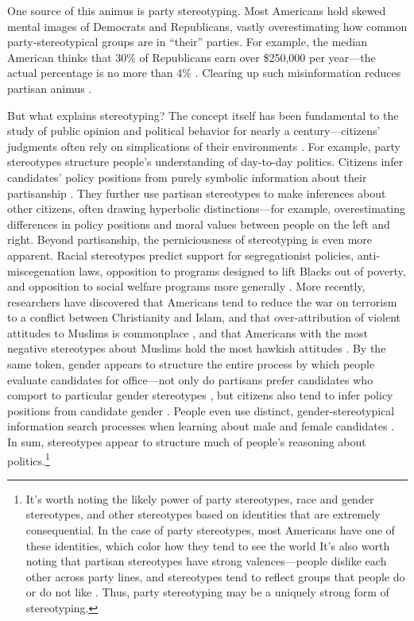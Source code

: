 \documentclass[12pt, letterpaper]{article}
\begin{document}
One source of this animus is party stereotyping. Most Americans hold skewed mental images of Democrats and Republicans, vastly overestimating how common party-stereotypical groups are in ``their'' parties. For example, the median American thinks that 30\% of Republicans earn over \$250,000 per year---the actual percentage is no more than 4\% \citep{ahler2018parties}. Clearing up such misinformation reduces partisan animus \citep{ahler2018parties}.

But what explains stereotyping? The concept itself has been fundamental to the study of public opinion and political behavior for nearly a century---citizens' judgments often rely on simplications of their environments \citep[e.g.,][]{Lippmann1922, edwards1940four}. For example, party stereotypes structure people's understanding of day-to-day politics. Citizens infer candidates' policy positions from purely symbolic information about their partisanship \citep{goggin2017disputed, lodge1986partisan, Rahn1993}. They further use partisan stereotypes to make inferences about other citizens, often drawing hyperbolic distinctions---for example, overestimating differences in policy positions \citep{LevenduskyMalhotra2013} and moral values \citep{GrahamNosekHaidt2012} between people on the left and right. Beyond partisanship, the perniciousness of stereotyping is even more apparent. Racial stereotypes predict support for segregationist policies, anti-miscegenation laws, opposition to programs designed to lift Blacks out of poverty, and opposition to social welfare programs more generally \citep{carmines2011on, ditonto2013AMPing, gilens1995racial, gilens1996poq, gilens1996race, peffley1997racial, sniderman1993scar}. More recently, researchers have discovered that Americans tend to reduce the war on terrorism to a conflict between Christianity and Islam, and that over-attribution of violent attitudes to Muslims is commonplace \citep{tessler2003arab}, and that Americans with the most negative stereotypes about Muslims hold the most hawkish attitudes \citep{sides2013stereotypes}. By the same token, gender appears to structure the entire process by which people evaluate candidates for office---not only do partisans prefer candidates who comport to particular gender stereotypes \citep{bernhard2019wearing}, but citizens also tend to infer policy positions from candidate gender \citep{ditonto2014gender}. People even use distinct, gender-stereotypical information search processes when learning about male and female candidates \citep{huddy1993gender}. In sum, stereotypes appear to structure much of people's reasoning about politics.\footnote{It's worth noting the likely power of party stereotypes, race and gender stereotypes, and other stereotypes based on identities that are extremely consequential. In the case of party stereotypes, most Americans have one of these identities, which color how they tend to see the world \citep[e.g.][]{bartels2000} It's also worth noting that partisan stereotypes have strong valences---people dislike each other across party lines, and stereotypes tend to reflect groups that people do or do not like \citep{kane2021who}. Thus, party stereotyping may be a uniquely strong form of stereotyping.}
\end{document}
